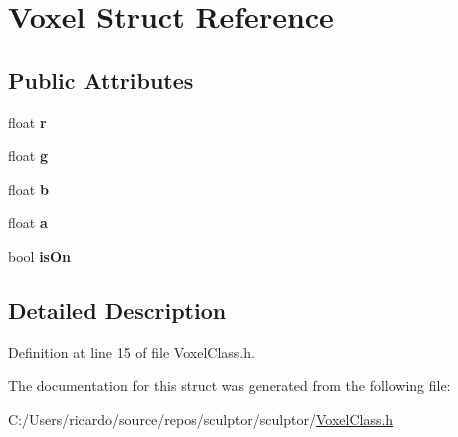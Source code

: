 \hypertarget{struct_voxel}{}\section{Voxel Struct Reference}
\label{struct_voxel}
\subsection*{Public Attributes}
\begin{DoxyCompactItemize}
\item 
\mbox{\label{struct_voxel_a06872ec79b836120b551a848968c0f1b}} 
float {\bfseries r}
\item 
\mbox{\label{struct_voxel_a27c0da1ed2ff430401d23ff171612a73}} 
float {\bfseries g}
\item 
\mbox{\label{struct_voxel_a5cd8432b1d7d0fd8b79e0fc7d10373a8}} 
float {\bfseries b}
\item 
\mbox{\label{struct_voxel_a3ce2579eb0a9f09a07112ce7498a638e}} 
float {\bfseries a}
\item 
\mbox{\label{struct_voxel_a6fbe8bd53f64685ac4210726d40fc775}} 
bool {\bfseries is\+On}
\end{DoxyCompactItemize}


\subsection{Detailed Description}


Definition at line 15 of file Voxel\+Class.\+h.



The documentation for this struct was generated from the following file\+:\begin{DoxyCompactItemize}
\item 
C\+:/\+Users/ricardo/source/repos/sculptor/sculptor/\mbox{\hyperlink{_voxel_class_8h}{Voxel\+Class.\+h}}\end{DoxyCompactItemize}
